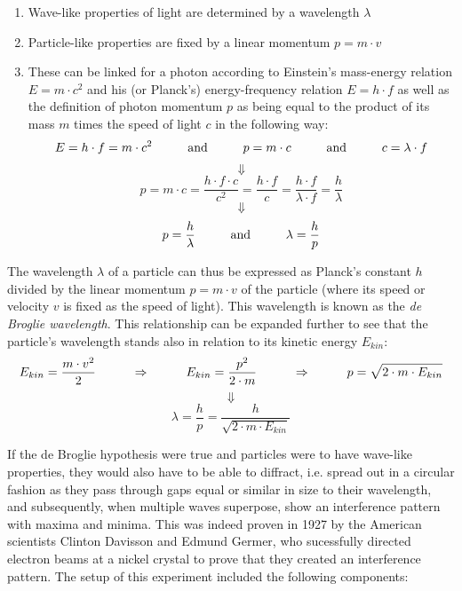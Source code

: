 \begin{enumerate}
	
	\item Wave-like properties of light are determined by a wavelength $\lambda$

	\item Particle-like properties are fixed by a linear momentum $p = m \cdot v$

	\item These can be linked for a photon according to Einstein's mass-energy relation $E = m \cdot c^2$ and his (or Planck's) energy-frequency relation $E = h \cdot f$ as well as the definition of photon momentum $p$ as being equal to the product of its mass $m$ times the speed of light $c$ in the following way: $$E = h \cdot f = m \cdot c^2 \hspace{1 cm} \text{and} \hspace{1 cm} p = m \cdot c \hspace{1 cm} \text{and} \hspace{1 cm} c = \lambda \cdot f$$ $$\Downarrow$$ $$p = m \cdot c = \frac{h \cdot f \cdot c}{c^2} = \frac{h \cdot f}{c} = \frac{h \cdot f}{\lambda \cdot f} = \frac{h}{\lambda}$$ $$\Downarrow$$ $$p = \frac{h}{\lambda} \hspace{1 cm} \text{and} \hspace{1 cm} \lambda = \frac{h}{p}$$

\end{enumerate}

The wavelength $\lambda$ of a particle can thus be expressed as Planck's constant $h$ divided by the linear momentum $p = m \cdot v$ of the particle (where its speed or velocity $v$ is fixed as the speed of light). This wavelength is known as the \emph{de Broglie wavelength}. This relationship can be expanded further to see that the particle's wavelength stands also in relation to its kinetic energy $E_{kin}$: $$E_{kin} = \frac{m \cdot v^2}{2} \hspace{1 cm} \Rightarrow \hspace{1 cm} E_{kin} =  \frac{p^2}{2 \cdot m} \hspace{1 cm} \Rightarrow \hspace{1 cm} p = \sqrt{2 \cdot m \cdot E_{kin}}$$ $$\Downarrow$$ $$\lambda = \frac{h}{p} = \frac{h}{\sqrt{2 \cdot m \cdot E_{kin}}}$$

\pagebreak


If the de Broglie hypothesis were true and particles were to have wave-like properties, they would also have to be able to diffract, i.e. spread out in a circular fashion as they pass through gaps equal or similar in size to their wavelength, and subsequently, when multiple waves superpose, show an interference pattern with maxima and minima. This was indeed proven in 1927 by the American scientists Clinton Davisson and Edmund Germer, who sucessfully directed electron beams at a nickel crystal to prove that they created an interference pattern. The setup of this experiment included the following components:

